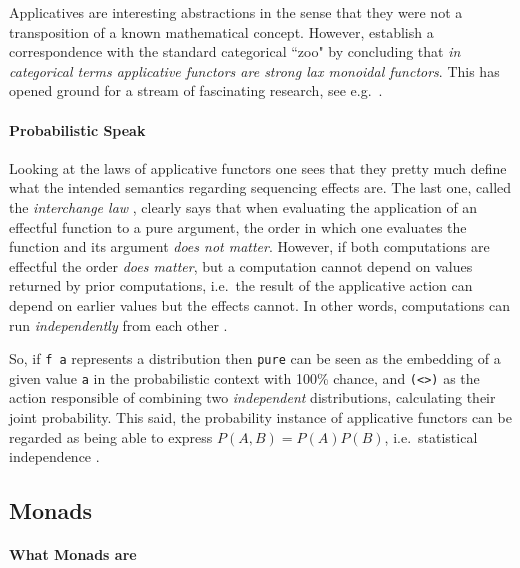 \documentclass[
  oneside,
  11pt, a4paper,
  footinclude=true,
  headinclude=true,
  cleardoublepage=empty
]{scrbook}
\theoremstyle{definition}
\theoremstyle{definition}
\begin{document}
	Applicatives are interesting abstractions in the sense that they were not a transposition of a known mathematical concept. However, \cite{mcbride2008applicative} establish a correspondence with the standard categorical ``zoo" by concluding that \emph{in categorical terms applicative functors are strong lax monoidal functors}. This has opened ground for a stream of fascinating research, see e.g.\ \citep{Paterson:2012:CAF:2368298.2368321, Cooper:2008:EFA:1485346.1485361, DBLP:journals/corr/CapriottiK14}.
	        
         \paragraph{Probabilistic Speak}
	            
	Looking at the laws of applicative functors one sees that they pretty much define what the intended semantics regarding sequencing effects are. The last one, called the \emph{interchange law} \citep{mcbride2008applicative}, clearly says that when evaluating the application of an effectful function to a pure argument, the order in which one evaluates the function and its argument \emph{does not matter}. However, if both computations are effectful the order \emph{does matter}, but a computation cannot depend on values returned by prior computations, i.e.\ the result of the applicative action can depend on earlier values but the effects cannot. In other words, computations can run \emph{independently} from each other \citep{Cooper:2008:EFA:1485346.1485361, Marlow:2014:NFA:2692915.2628144, Marlow:2016:DHD:3241625.2976007, andrey2019selective}.
	            
	So, if \texttt{f a} represents a distribution then \texttt{pure} can be seen as the embedding of a given value \texttt{a} in the probabilistic context with 100\% chance, and \texttt{(\textless*\textgreater)} as the action responsible of combining two \emph{independent} distributions, calculating their joint probability. This said, the probability instance of applicative functors can be regarded as being able to express $P(A, B) = P(A)P(B)$, i.e.\ statistical independence \citep{jtobin}.
	    
	    \subsection{Monads}
	    
	        \paragraph{What Monads are}
	        
\end{document}
